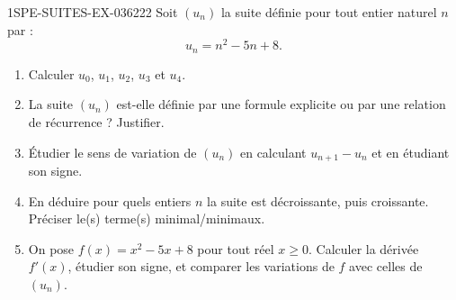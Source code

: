 \begin{exercice}{1SPE-SUITES-EX-036}{2}{22}
Soit $(u_n)$ la suite définie pour tout entier naturel $n$ par :
\[
  u_n = n^2 - 5n + 8.
\]

\begin{enumerate}
  \item Calculer $u_0$, $u_1$, $u_2$, $u_3$ et $u_4$.

  \item La suite $(u_n)$ est-elle définie par une formule explicite ou par une relation de récurrence ? Justifier.

  \item Étudier le sens de variation de $(u_n)$ en calculant $u_{n+1} - u_n$ et en étudiant son signe.

  \item En déduire pour quels entiers $n$ la suite est décroissante, puis croissante. Préciser le(s) terme(s) minimal/minimaux.

  \item On pose $f(x) = x^2 - 5x + 8$ pour tout réel $x \geq 0$. Calculer la dérivée $f'(x)$, étudier son signe, et comparer les variations de $f$ avec celles de $(u_n)$.
\end{enumerate}
\end{exercice}
